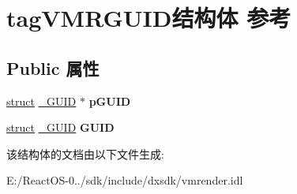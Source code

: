 \hypertarget{structtag_v_m_r_g_u_i_d}{}\section{tag\+V\+M\+R\+G\+U\+I\+D结构体 参考}
\label{structtag_v_m_r_g_u_i_d}
\subsection*{Public 属性}
\begin{DoxyCompactItemize}
\item 
\mbox{\label{structtag_v_m_r_g_u_i_d_a66d3da6418ade84c59d4c2cd6344a2c7}} 
\hyperlink{interfacestruct}{struct} \hyperlink{struct___g_u_i_d}{\+\_\+\+G\+U\+ID} $\ast$ {\bfseries p\+G\+U\+ID}
\item 
\mbox{\label{structtag_v_m_r_g_u_i_d_add6b343daf769e7592030a34852319e4}} 
\hyperlink{interfacestruct}{struct} \hyperlink{struct___g_u_i_d}{\+\_\+\+G\+U\+ID} {\bfseries G\+U\+ID}
\end{DoxyCompactItemize}


该结构体的文档由以下文件生成\+:\begin{DoxyCompactItemize}
\item 
E\+:/\+React\+O\+S-\/0../sdk/include/dxsdk/vmrender.\+idl\end{DoxyCompactItemize}
